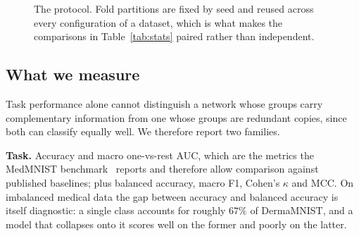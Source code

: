 \begin{figure}[!t]
\centering
{}
\caption{The protocol. Fold partitions are fixed by seed and reused across every
configuration of a dataset, which is what makes the comparisons in
Table~\ref{tab:stats} paired rather than independent.}
\label{fig:protocol}
\end{figure}

\subsection{What we measure}

Task performance alone cannot distinguish a network whose groups carry
complementary information from one whose groups are redundant copies, since
both can classify equally well. We therefore report two families.

\textbf{Task.} Accuracy and macro one-vs-rest AUC, which are the metrics the
MedMNIST benchmark~\cite{yang2023medmnist} reports and therefore allow comparison against published
baselines; plus balanced accuracy, macro F1, Cohen's $\kappa$ and MCC. On
imbalanced medical data the gap between accuracy and balanced accuracy is itself
diagnostic: a single class accounts for roughly $67\%$ of DermaMNIST, and a
model that collapses onto it scores well on the former and poorly on the latter.

